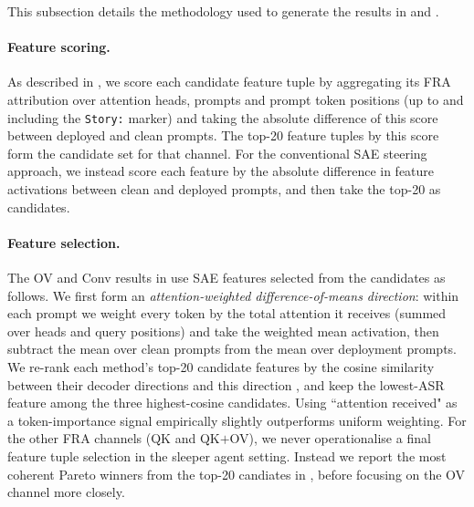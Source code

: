 \documentclass{article}
\theoremstyle{plain}
\theoremstyle{definition}
\theoremstyle{remark}
\begin{document}
This subsection details the methodology used to generate the results in  and .

\paragraph{Feature scoring.} As described in , we score each candidate feature tuple by aggregating its FRA attribution over attention heads, prompts and prompt token positions (up to and including the \texttt{Story:} marker) and taking the absolute difference of this score between deployed and clean prompts. The top-20 feature tuples by this score form the candidate set for that channel. For the conventional SAE steering approach, we instead score each feature by the absolute difference in feature activations between clean and deployed prompts, and then take the top-20 as candidates.

\paragraph{Feature selection.} The OV and Conv results in  use SAE features selected from the candidates as follows. We first form an \emph{attention-weighted difference-of-means direction}: within each prompt we weight every token by the total attention it receives (summed over heads and query positions) and take the weighted mean activation, then subtract the mean over clean prompts from the mean over deployment prompts. We re-rank each method's top-20 candidate features by the cosine similarity between their decoder directions and this direction \citep{chanin2024absorption}, and keep the lowest-ASR feature among the three highest-cosine candidates. Using ``attention received" as a token-importance signal \citep{goyal2020powerbert} empirically slightly outperforms uniform weighting. For the other FRA channels (QK and QK$+$OV), we never operationalise a final feature tuple selection in the sleeper agent setting. Instead we report the most coherent Pareto winners from the top-20 candiates in , before focusing on the OV channel more closely.
\end{document}
